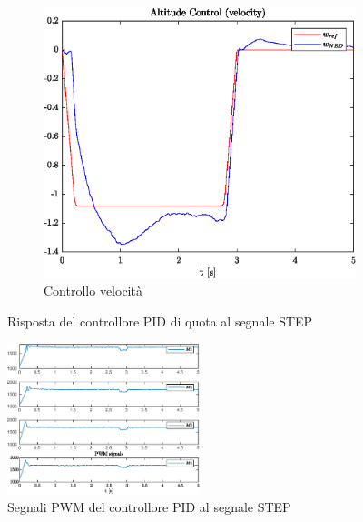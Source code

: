 \begin{figure}
\begin{subfigure}{0.45\textwidth}
		\includegraphics[width=1\textwidth]{Simulazioni/Figure/PID/STEP/AltitudeControlVel}
		\caption{Controllo velocità}
	\end{subfigure}
	\caption{Risposta del controllore PID di quota al segnale STEP}
\end{figure}

\begin{figure}
	\centering
	\includegraphics[width=0.5\textwidth]{Simulazioni/Figure/PID/STEP/PWM}
	\caption{Segnali PWM del controllore PID al segnale STEP}
\end{figure}
\clearpage
